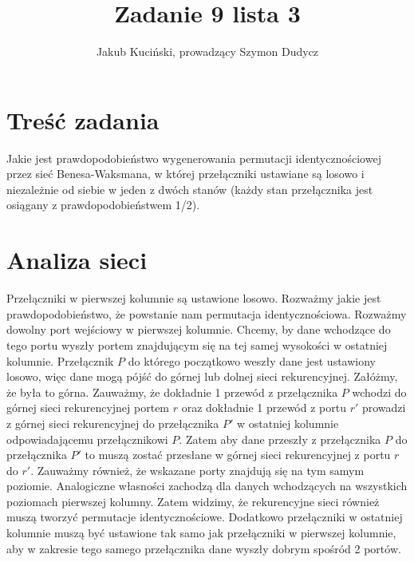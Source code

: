 \documentclass{article}
\title{Zadanie 9 lista 3}
\author{Jakub Kuciński, prowadzący Szymon Dudycz}
\begin{document}
\maketitle

\tableofcontents

\section{Treść zadania}
Jakie jest prawdopodobieństwo wygenerowania permutacji identycznościowej przez sieć Benesa-Waksmana, w której przełączniki ustawiane są losowo i niezależnie od siebie w jeden z dwóch stanów (każdy stan przełącznika jest osiągany z prawdopodobieństwem 1/2).

\section{Analiza sieci}
Przełączniki w pierwszej kolumnie są ustawione losowo. Rozważmy jakie jest prawdopodobieństwo, że powstanie nam permutacja identycznościowa. Rozważmy dowolny port wejściowy w pierwszej kolumnie. Chcemy, by dane wchodzące do tego portu wyszły portem znajdującym się na tej samej wysokości w ostatniej kolumnie.
Przełącznik $P$ do którego początkowo weszły dane jest ustawiony losowo, więc dane mogą pójść do górnej lub dolnej sieci rekurencyjnej. Załóżmy, że była to górna. Zauważmy, że dokładnie 1 przewód z przełącznika $P$ wchodzi do górnej sieci rekurencyjnej portem $r$ oraz dokładnie 1 przewód z portu $r'$ prowadzi z górnej sieci rekurencyjnej do przełącznika $P'$ w ostatniej kolumnie odpowiadającemu przełącznikowi $P$. Zatem aby dane przeszły z przełącznika $P$ do przełącznika $P'$ to muszą zostać przesłane w górnej sieci rekurencyjnej z portu $r$ do $r'$. Zauważmy również, że wskazane porty znajdują się na tym samym poziomie. Analogiczne własności zachodzą dla danych wchodzących na wszystkich poziomach pierwszej kolumny. Zatem widzimy, że rekurencyjne sieci również muszą tworzyć permutacje identycznościowe. Dodatkowo przełączniki w ostatniej kolumnie muszą być ustawione tak samo jak przełączniki w pierwszej kolumnie, aby w zakresie tego samego przełącznika dane wyszły dobrym spośród 2 portów.

\newpage
\end{document}
